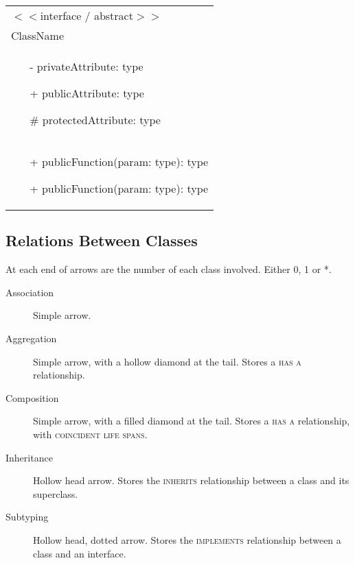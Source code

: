 \documentclass[landscape]{cheat}
\begin{document}
\begin{multicols*}{3}
\begin{tabular}{|p{}|}
\hline
    $<<$interface / abstract$>>$ \\
    ClassName \\
\hline
\begin{itemize}
    \item[-] privateAttribute: type
    \item[+] publicAttribute: type
    \item[\#] protectedAttribute: type
\end{itemize} \\ \hline
\begin{itemize}
    \item[+] publicFunction(param: type): type
    \item[+] publicFunction(param: type): type
\end{itemize} \\ \hline
\end{tabular}

\subsection{Relations Between Classes}
At each end of arrows are the number of each class involved. Either 0, 1 or *.
\begin{description}
    \item[Association]
        Simple arrow.
    \item[Aggregation]
        Simple arrow, with a hollow diamond at the tail.
        Stores a \textsc{has a} relationship.
    \item[Composition]
        Simple arrow, with a filled diamond at the tail.
        Stores a \textsc{has a} relationship, with \textsc{coincident life spans}.
    \item[Inheritance]
        Hollow head arrow.
        Stores the \textsc{inherits} relationship between a class and its superclass.
    \item[Subtyping]
        Hollow head, dotted arrow.
        Stores the \textsc{implements} relationship between a class and an interface.
\end{description}


\end{multicols*}
\end{document}
